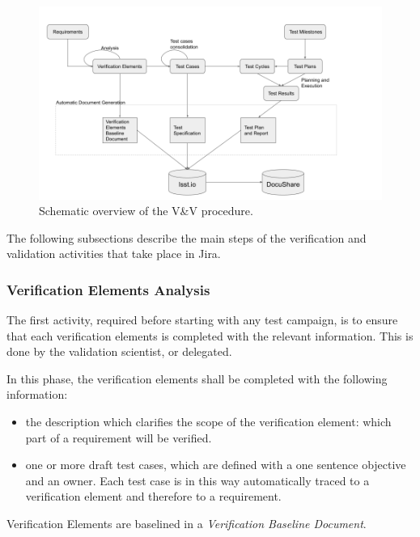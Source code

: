 \begin{figure}
\begin{center}
\includegraphics[width=\textwidth]{imgs/VandVprocedure.png}
 \caption{Schematic overview of the V\&V procedure.}
 \label{fig:vandvtools}
\end{center}
\end{figure}

The following subsections describe the main steps of the verification and validation activities that take place in Jira.


\subsubsection{Verification Elements Analysis}

The first activity, required before starting with any test campaign, is to ensure that each verification elements is completed with the relevant information.
This is done by the validation scientist, or delegated.

In this phase, the verification elements shall be completed with the following information:
\begin{itemize}
\item the description which clarifies the scope of the verification element: which part of a requirement will be verified.
\item one or more draft test cases, which are  defined with a one sentence objective and an owner. Each test case is in this way automatically traced to a verification element and therefore to a requirement.
\end{itemize}
Verification Elements are baselined in a \textit{Verification Baseline Document}.


